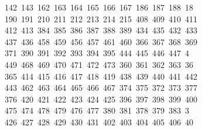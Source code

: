 \begin{tabbing}
\ 142\ 143\ 162\ 163\ 164\ 165\ 166\ 167\ 186\ 187\ 188\ 18\\[0pt]
\ 190\ 191\ 210\ 211\ 212\ 213\ 214\ 215\ 408\ 409\ 410\ 411\\[0pt]
\>\ 412\ 413\ 384\ 385\ 386\ 387\ 388\ 389\ 434\ 435\ 432\ 433\\[0pt]
\>\ 437\ 436\ 458\ 459\ 456\ 457\ 461\ 460\ 366\ 367\ 368\ 369\ \\[0pt]
\ 371\ 390\ 391\ 392\ 393\ 394\ 395\ 444\ 445\ 446\ 447\ 4\\[0pt]
\ 449\ 468\ 469\ 470\ 471\ 472\ 473\ 360\ 361\ 362\ 363\ 36\\[0pt]
\ 365\ 414\ 415\ 416\ 417\ 418\ 419\ 438\ 439\ 440\ 441\ 442\\[0pt]
\>\ 443\ 462\ 463\ 464\ 465\ 466\ 467\ 374\ 375\ 372\ 373\ 377\\[0pt]
\>\ 376\ 420\ 421\ 422\ 423\ 424\ 425\ 396\ 397\ 398\ 399\ 400\ \\[0pt]
\ 475\ 474\ 478\ 479\ 476\ 477\ 380\ 381\ 378\ 379\ 383\ 3\\[0pt]
\ 426\ 427\ 428\ 429\ 430\ 431\ 402\ 403\ 404\ 405\ 406\ 40\\[0pt]

\end{tabbing}
